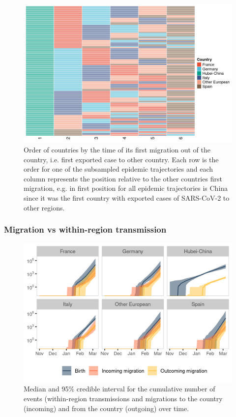 \documentclass[12pt]{article}
\begin{document}
\begin{figure}[ht]
    \centering
    \includegraphics[width=\textwidth]{201030_europe3_figtraj06.png}
    \caption{Order of countries by the time of its first migration out of the country, i.e. first exported case to other country. Each row is the order for one of the subsampled epidemic trajectories and each column represents the position relative to the other countries first migration, e.g. in first position for all epidemic trajectories is China since it was the first country with exported cases of SARS-CoV-2 to other regions.}
    \label{fig:first_omig}
\end{figure}

\subsubsection*{Migration vs within-region transmission}

\begin{figure}[ht]
    \centering
    \includegraphics[width=\textwidth]{201030_europe3_figtraj07.png}
    \caption{Median and 95\% credible interval for the cumulative number of events (within-region transmissions and migrations to the country (incoming) and from the country (outgoing) over time.}
    \label{fig:events}
\end{figure}
\end{document}
